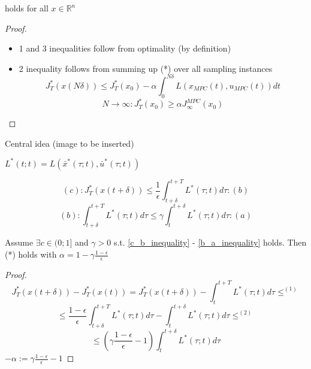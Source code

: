 holds for all $x \in \mathbb{R}^n$

\begin{proof}
\begin{itemize}
\item 1 and 3 inequalities follow from optimality (by definition)
\item 2 inequality follows from summing up (*) over all sampling instances
\begin{equation}
J^*_T(x(N\delta)) \leq J_T^*(x_0) - \alpha \int_0^{N\delta}L(x_{MPC}(t), u_{MPC}(t))dt
\end{equation}
\begin{equation}
N \to \infty : J_T^*(x_0) \geq \alpha J_{\infty}^{MPC}(x_0) 
\end{equation}
\end{itemize}
\end{proof}

Central idea (image to be inserted)

$L^*(t;t) = L(\bar x^*(\tau;t), \bar u^*(\tau;t))$

\begin{equation}\label{c_b_inequality}
(c): J_T^*(x(t+\delta)) \leq \frac{1}{\epsilon} \int_{t+\delta}^{t+T}L^*(\tau;t)d\tau :(b)
\end{equation}
\begin{equation}\label{b_a_inequality}
(b): \int_{t+\delta}^{t+T}L^*(\tau;t)d\tau \leq \gamma \int_{t}^{t+\delta}L^*(\tau;t)d\tau :(a)
\end{equation} 

\begin{Theorem}

Assume $\exists c \in (0;1]$ and $\gamma > 0$ s.t. \ref{c_b_inequality} - \ref{b_a_inequality} holds. Then (*) holds with $\alpha =1 - \gamma \frac{1-\epsilon}{\epsilon}$

\begin{proof}
\begin{equation*}
J_T^*(x(t+\delta)) - J_T^*(x(t)) = J_T^*(x(t+\delta)) - \int_{t}^{t+T}L^*(\tau;t)d\tau \leq^{(1)}
\end{equation*}
\begin{equation*}
\leq \frac{1-\epsilon}{\epsilon} \int_{t+\delta}^{t+T}L^*(\tau;t)d\tau - \int_t^{t+\delta}L^*(\tau;t)d\tau \leq^{(2)}
\end{equation*}
\begin{equation*}
\leq (\gamma \frac{1-\epsilon}{\epsilon} - 1) \int_t^{t+\delta}L^*(\tau;t)d\tau
\end{equation*} 
$-\alpha := \gamma \frac{1-\epsilon}{\epsilon} - 1$ 
\end{proof}
\end{Theorem}

